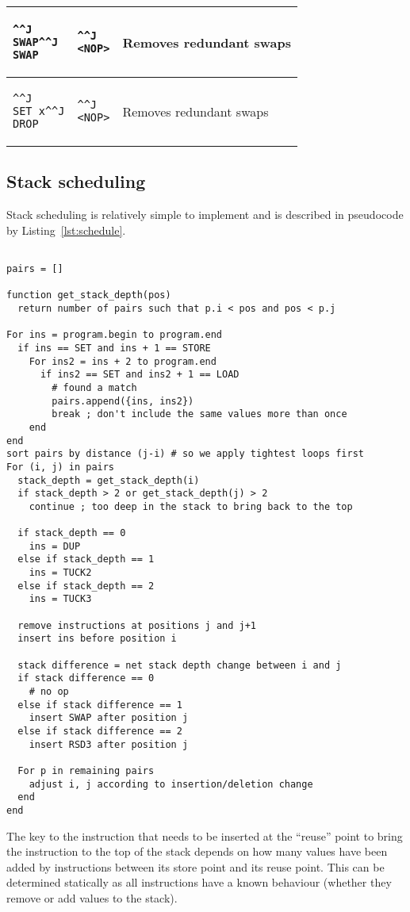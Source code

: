 \begin{table}
\begin{tabularx}{\linewidth}{l l X}
\begin{lstlisting}^^J
SWAP^^J
SWAP
\end{lstlisting} &
\begin{lstlisting}^^J
<NOP>
\end{lstlisting} &
Removes redundant swaps \\ \midrule
\begin{lstlisting}^^J
SET x^^J
DROP
\end{lstlisting} &
\begin{lstlisting}^^J
<NOP>
\end{lstlisting} &
Removes redundant swaps \\ \bottomrule
\end{tabularx}
\end{table}

\subsection{Stack scheduling}
Stack scheduling is relatively simple to implement and is described in
pseudocode by Listing~\ref{lst:schedule}.

\begin{lstlisting}[caption={Stack scheduling
implementation},float,label=lst:schedule]

pairs = []

function get_stack_depth(pos)
  return number of pairs such that p.i < pos and pos < p.j

For ins = program.begin to program.end
  if ins == SET and ins + 1 == STORE
    For ins2 = ins + 2 to program.end
      if ins2 == SET and ins2 + 1 == LOAD
        # found a match
        pairs.append({ins, ins2})
        break ; don't include the same values more than once
    end
end
sort pairs by distance (j-i) # so we apply tightest loops first
For (i, j) in pairs
  stack_depth = get_stack_depth(i)
  if stack_depth > 2 or get_stack_depth(j) > 2
    continue ; too deep in the stack to bring back to the top

  if stack_depth == 0
    ins = DUP
  else if stack_depth == 1
    ins = TUCK2
  else if stack_depth == 2
    ins = TUCK3

  remove instructions at positions j and j+1
  insert ins before position i

  stack difference = net stack depth change between i and j
  if stack difference == 0
    # no op
  else if stack difference == 1
    insert SWAP after position j
  else if stack difference == 2
    insert RSD3 after position j

  For p in remaining pairs
    adjust i, j according to insertion/deletion change
  end
end
\end{lstlisting}

The key to the instruction that needs to be inserted at the ``reuse'' point to
bring the instruction to the top of the stack depends on how many values have
been added by instructions between its store point and its reuse point. This can
be determined statically as all instructions have a known behaviour (whether
they remove or add values to the stack).
